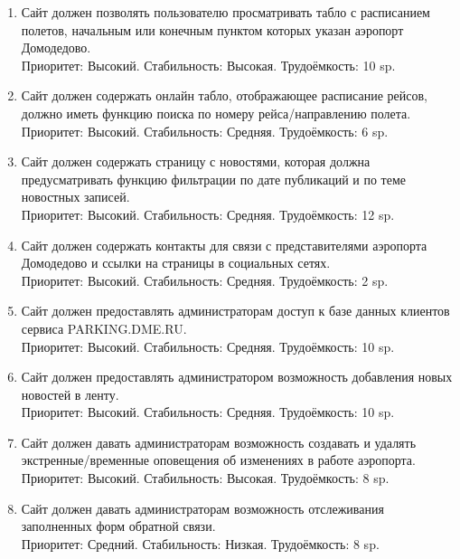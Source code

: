 
\begin{enumerate}
      \item Сайт должен позволять пользователю просматривать
            табло с расписанием полетов, начальным или конечным
            пунктом которых указан аэропорт Домодедово. \\
            Приоритет: Высокий. Стабильность: Высокая. Трудоёмкость: 10 sp.

      \item Сайт должен содержать онлайн табло, отображающее расписание рейсов,
            должно иметь функцию поиска по номеру рейса/направлению полета. \\
            Приоритет: Высокий. Стабильность: Средняя. Трудоёмкость: 6 sp.

      \item Сайт должен содержать страницу с новостями, которая должна
            предусматривать функцию фильтрации по дате публикаций и по
            теме новостных записей. \\
            Приоритет: Высокий. Стабильность: Средняя. Трудоёмкость: 12 sp.

      \item Сайт должен содержать контакты для связи с
            представителями аэропорта Домодедово и ссылки
            на страницы в социальных сетях. \\
            Приоритет: Высокий. Стабильность: Средняя. Трудоёмкость: 2 sp.

      \item Сайт должен предоставлять администраторам
            доступ к базе данных клиентов сервиса
            PARKING.DME.RU. \\
            Приоритет: Высокий. Стабильность: Средняя. Трудоёмкость: 10 sp.

      \item Сайт должен предоставлять администратором возможность
            добавления новых новостей в ленту. \\
            Приоритет: Высокий. Стабильность: Средняя. Трудоёмкость: 10 sp.

      \item Сайт должен давать администраторам возможность
            создавать и удалять экстренные/временные
            оповещения об изменениях в работе аэропорта. \\
            Приоритет: Высокий. Стабильность: Высокая. Трудоёмкость: 8 sp.

      \item Сайт должен давать администраторам возможность
            отслеживания заполненных форм обратной связи. \\
            Приоритет: Средний. Стабильность: Низкая. Трудоёмкость: 8 sp.


\end{enumerate}
